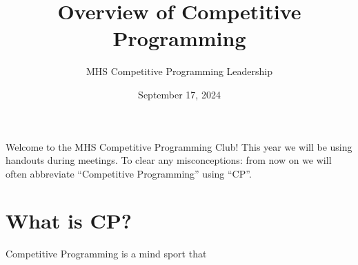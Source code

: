 \documentclass{article}
\title{Overview of Competitive Programming}
\date{September 17, 2024}
\author{MHS Competitive Programming Leadership}
\begin{document}
\maketitle
Welcome to the MHS Competitive Programming Club! This year we will be using handouts during meetings. To clear any misconceptions: from now on we will often abbreviate ``Competitive Programming'' using ``CP''.

\section{What is CP?}
Competitive Programming is a mind sport that 
\end{document}

